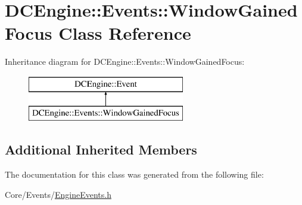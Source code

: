 \hypertarget{classDCEngine_1_1Events_1_1WindowGainedFocus}{\section{D\-C\-Engine\-:\-:Events\-:\-:Window\-Gained\-Focus Class Reference}
\label{classDCEngine_1_1Events_1_1WindowGainedFocus}
}
Inheritance diagram for D\-C\-Engine\-:\-:Events\-:\-:Window\-Gained\-Focus\-:\begin{figure}[H]
\begin{center}
\leavevmode
\includegraphics[height=2.000000cm]{classDCEngine_1_1Events_1_1WindowGainedFocus}
\end{center}
\end{figure}
\subsection*{Additional Inherited Members}


The documentation for this class was generated from the following file\-:\begin{DoxyCompactItemize}
\item 
Core/\-Events/\hyperlink{EngineEvents_8h}{Engine\-Events.\-h}\end{DoxyCompactItemize}

